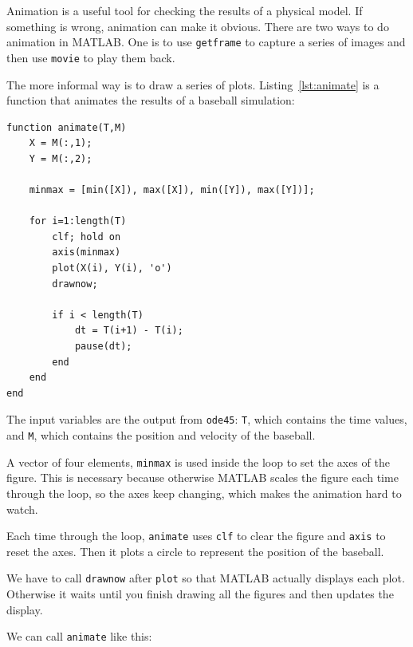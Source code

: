 Animation is a useful tool for checking the results of a physical model.
If something is wrong, animation can make it obvious.
There are two ways to do animation in MATLAB.
One is to use \lstinline{getframe} to capture a series of images and then use \lstinline{movie} to play them back.


The more informal way is to draw a series of plots.  Listing~\ref{lst:animate} is a function that animates the results of a baseball simulation:

\begin{lstlisting}[caption={A function that animates the results of a baseball simulation}, label={lst:animate}]
function animate(T,M)
    X = M(:,1);
    Y = M(:,2);

    minmax = [min([X]), max([X]), min([Y]), max([Y])];

    for i=1:length(T)
        clf; hold on
        axis(minmax)
        plot(X(i), Y(i), 'o')
        drawnow;

        if i < length(T)
            dt = T(i+1) - T(i);
            pause(dt);
        end
    end
end
\end{lstlisting}

The input variables are the output from \lstinline{ode45}: \lstinline{T}, which contains the time values, and \lstinline{M}, which contains the position and velocity of the baseball.


A vector of four elements, \lstinline{minmax} is used inside the loop to set the axes of the figure.
This is necessary because otherwise MATLAB scales the figure each time through the loop,
so the axes keep changing, which makes the animation hard to watch.


Each time through the loop, \lstinline{animate} uses \lstinline{clf}
to clear the figure and \lstinline{axis} to reset the axes.  Then it plots a circle to represent the position of the \mbox{baseball}.


We have to call \lstinline{drawnow} after \lstinline{plot} so
that MATLAB actually displays each plot.  Otherwise it waits
until you finish drawing all the figures and then updates
the display.

We can call \lstinline{animate} like this:

